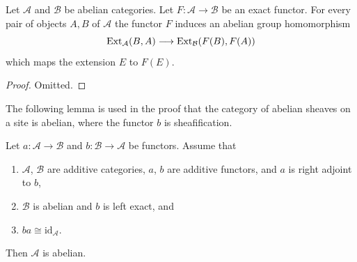 \begin{lemma}
\label{lemma-exact-functor-ext}
Let $\mathcal{A}$ and $\mathcal{B}$ be abelian categories.
Let $F : \mathcal{A} \to \mathcal{B}$ be an exact functor.
For every pair of objects $A, B$ of $\mathcal{A}$ the
functor $F$ induces an abelian group homomorphism
$$
\mathop{\mathrm{Ext}}\nolimits_\mathcal{A}(B, A)
\longrightarrow
\mathop{\mathrm{Ext}}\nolimits_\mathcal{B}(F(B), F(A))
$$
which maps the extension $E$ to $F(E)$.
\end{lemma}

\begin{proof}
Omitted.
\end{proof}

\noindent
The following lemma is used in the proof that the category of abelian
sheaves on a site is abelian, where the functor $b$ is sheafification.

\begin{lemma}
\label{lemma-adjoint-get-abelian}
Let $a : \mathcal{A} \to \mathcal{B}$ and $b : \mathcal{B} \to \mathcal{A}$
be functors. Assume that
\begin{enumerate}
\item $\mathcal{A}$, $\mathcal{B}$ are additive categories,
$a$, $b$ are additive functors, and $a$ is right adjoint to $b$,
\item $\mathcal{B}$ is abelian and $b$ is left exact, and
\item $ba \cong \text{id}_\mathcal{A}$.
\end{enumerate}
Then $\mathcal{A}$ is abelian.
\end{lemma}

